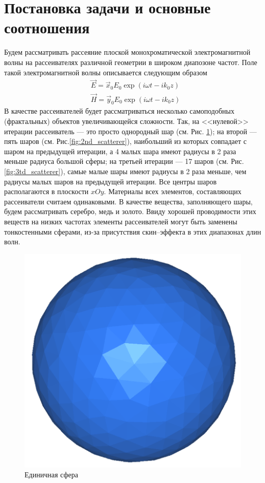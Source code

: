 \section{Постановка задачи и основные соотношения}
Будем рассматривать рассеяние плоской монохроматической электромагнитной волны на рассеивателях различной геометрии в широком диапозоне частот. Поле такой электромагнитной волны описывается следующим образом
\begin{align}
	&\vec{E}= \vec{x}_0{E}_{0} \exp (i\omega t - i k_0z)\\
	&\vec{H}= \vec{y}_0{E}_{0} \exp (i\omega t - i k_0z)
\end{align}
В качестве рассеивателей будет рассматриваться несколько самоподобных (фрактальных) объектов увеличивающейся сложности. Так, на <<нулевой>> итерации рассеиватель --- это просто однородный шар (см. Рис. \ref{fig:1st_scatterer}); на второй --- пять шаров (см. Рис.\ref{fig:2nd_scatterer}), наибольший из которых совпадает с шаром на предыдущей итерации, а 4 малых шара имеют радиусы в 2 раза меньше радиуса большой сферы; на третьей итерации --- 17 шаров (см. Рис. \ref{fig:3td_scatterer}), самые малые шары имеют радиусы в 2 раза меньше, чем радиусы малых шаров на предыдущей итерации. Все центры шаров располагаются в плоскости $xOy$. Материалы всех элементов, составляющих рассеиватели считаем одинаковыми. В качестве вещества, заполняющего шары, будем рассматривать серебро, медь и золото. Ввиду хорошей проводимости этих веществ на низких частотах элементы рассеивателей могут быть заменены тонкостенными сферами, из-за присутствия скин--эффекта в этих диапазонах длин волн.
\newpage
\begin{figure}[h!]
	\centering
	\includegraphics[width=0.4\linewidth]{1st_scatterer}
	\caption{Единичная сфера}
	\label{fig:1st_scatterer}
\end{figure}
